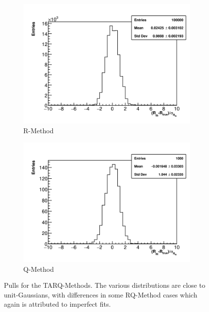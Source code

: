 \begin{figure}[]
    \begin{subfigure}[t]{0.45\textwidth}
        \centering
        \includegraphics[width=\textwidth]{Rpull_RMethod}
        \caption{R-Method}
    \end{subfigure}
    \hspace{1mm}
    \begin{subfigure}[t]{0.45\textwidth}
        \centering
        \includegraphics[width=\textwidth]{Rpull_QMethod}
        \caption{Q-Method}
    \end{subfigure}
\caption[]{Pulls for the TARQ-Methods. The various distributions are close to unit-Gaussians, with differences in some RQ-Method cases which again is attributed to imperfect fits.}
\label{fig:pulls}
\end{figure}





